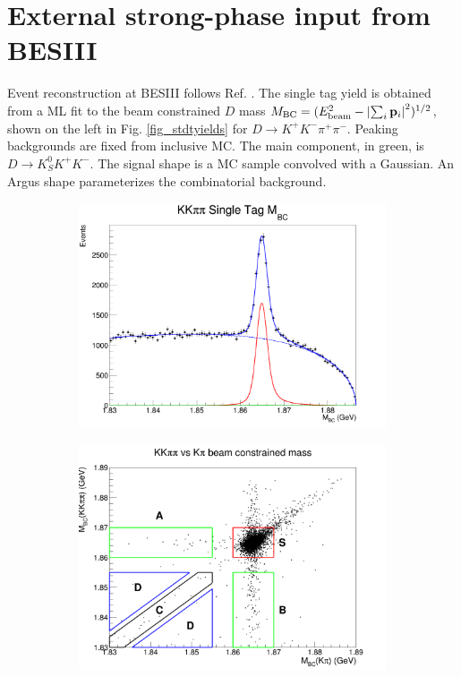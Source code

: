 \documentclass[12pt, a4paper, notitlepage, onecolumn]{article}
\begin{document}
\section{External strong-phase input from BESIII}
\noindent Event reconstruction at BESIII follows Ref. \cite{cite_KSKKAnalysis}. The single tag yield is obtained from a ML fit to the beam constrained $D$ mass $M_\text{BC} = (E_\text{beam}^2 - \abs{\sum_i\vb{p}_i}^2)^{1/2}$, shown on the left in Fig. \ref{fig_stdtyields} for $D\to K^+K^-\pi^+\pi^-$. Peaking backgrounds are fixed from inclusive MC. The main component, in green, is $D\to K_S^0K^+K^-$. The signal shape is a MC sample convolved with a Gaussian. An Argus shape parameterizes the combinatorial background.

\begin{figure}[H] 
  \centering
  \begin{subfigure}{0.5\textwidth}
    \centering
    \includegraphics[width=1\textwidth]{Plots/KKpipiSingleTagMBCPlot.png}
  \end{subfigure}%
  \begin{subfigure}{0.5\textwidth}
    \centering
    \includegraphics[width=1\textwidth]{Plots/KpiDoubleTagYield.png}

\end{subfigure}
\end{figure}
\end{document}
